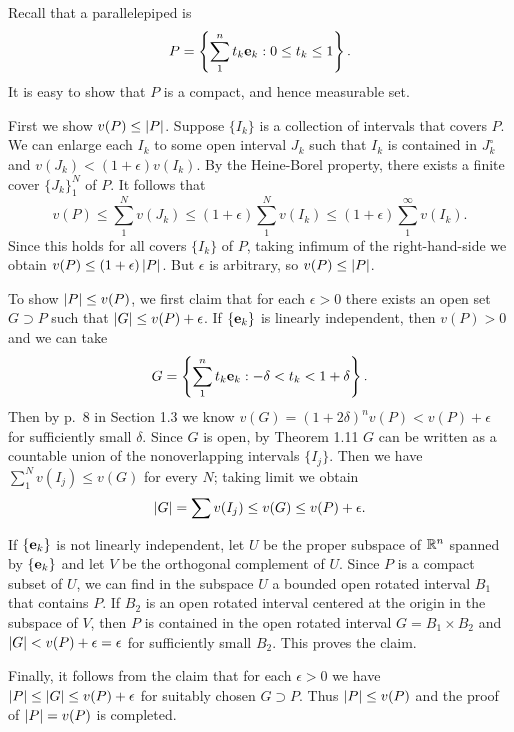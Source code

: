 \begin{exercise}{3.16}
  Recall that a parallelepiped is
  \[
    P = \left\{ \sum_1^n t_k \mathbf{e}_k : 0 \le t_k \le 1 \right\}.
  \]
  It is easy to show that $P$ is a compact, and hence measurable set.

  First we show $v(P) \le \left\vert P\right\vert$.
  Suppose $\{I_k\}$ is a collection of intervals that covers $P$.
  We can enlarge each $I_k$ to some open interval $J_k$ such that
  $I_k$ is contained in $J_k^\circ$ and $v(J_k) < (1+\epsilon) v(I_k)$.
  By the Heine-Borel property,
  there exists a finite cover $\{J_k\}_1^N$ of $P$.
  It follows that
  \[
    v(P) \le \sum_1^N v(J_k) \le (1+\epsilon) \sum_1^N v(I_k)
    \le (1 + \epsilon) \sum_1^\infty v(I_k).
  \]
  Since this holds for all covers $\{I_k\}$ of $P$,
  taking infimum of the right-hand-side we obtain
  $v(P) \le (1 + \epsilon) \left\vert P\right\vert$.
  But $\epsilon$ is arbitrary,
  so $v(P) \le \left\vert P\right\vert$.

  To show $\left\vert P\right\vert \le v(P)$,
  we first claim that for each $\epsilon > 0$
  there exists an open set $G \supset P$
  such that $\left\vert G\right\vert \le v(P) + \epsilon$.
  If $\{\mathbf{e}_k\}$ is linearly independent,
  then $v(P) > 0$ and we can take
  \[
    G = \left\{ \sum_1^n t_k \mathbf{e}_k : -\delta < t_k < 1 + \delta \right\}.
  \]
  Then by p.\ 8 in Section 1.3 we know
  $v(G) = (1 + 2\delta)^n v(P) < v(P) + \epsilon$
  for sufficiently small $\delta$.
  Since $G$ is open,
  by Theorem 1.11 $G$ can be written as a countable union
  of the nonoverlapping intervals $\{I_j\}$.
  Then we have $\sum_1^N v(I_j) \le v(G)$ for every $N$;
  taking limit we obtain
  \[
    \left\vert G\right\vert = \sum v(I_j) \le v(G) \le v(P) + \epsilon.
  \]

  If $\{\mathbf{e}_k\}$ is not linearly independent,
  let $U$ be the proper subspace of $\mathbb{R}^n$ spanned by $\{\mathbf{e}_k\}$
  and let $V$ be the orthogonal complement of $U$.
  Since $P$ is a compact subset of $U$,
  we can find in the subspace $U$
  a bounded open rotated interval $B_1$ that contains $P$.
  If $B_2$ is an open rotated interval centered at the origin
  in the subspace of $V$,
  then $P$ is contained in the open rotated interval $G = B_1 \times B_2$
  and $\left\vert G\right\vert < v(P) + \epsilon = \epsilon$ for sufficiently small $B_2$.
  This proves the claim.

  Finally, it follows from the claim that for each $\epsilon > 0$
  we have $\left\vert P\right\vert \le \left\vert G\right\vert \le v(P) + \epsilon$ for suitably chosen $G \supset P$.
  Thus $\left\vert P\right\vert \le v(P)$ and the proof of $\left\vert P\right\vert = v(P)$ is completed.
\end{exercise}

